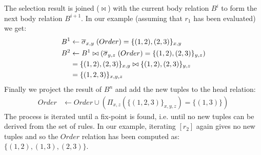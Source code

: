 The selection result is joined ($\bowtie$) with the current body relation $B^{i}$ to form the next body relation $B^{i + 1}$. In our example (assuming that $r_1$ has been evaluated) we get:
\begin{align*}
B^{1} &\leftarrow \overline{\sigma}_{x, y}\;(Order) = \{(1, 2), (2, 3)\}_{x, y}\\
B^{2} &\leftarrow B^{1} \bowtie (\overline{\sigma}_{y, z}\;(Order) = \{(1, 2), (2, 3)\}_{y, z})\\
      &= \{(1, 2), (2, 3)\}_{x, y} \bowtie \{(1, 2), (2, 3)\}_{y, z}\\
      &= \{(1,2,3)\}_{x,y,z}
\end{align*}
\noindent
Finally we project the result of $B^n$ and add the new tuples to the head relation:
\begin{align*}
Order & \leftarrow Order \cup (\Pi_{x,z}(\{(1,2,3)\}_{x,y,z}) = \{(1,3)\})
\end{align*}
\noindent
The process is iterated until a fix-point is found, i.e. until no new tuples can be derived from the set of rules. In our example, iterating $[r_2]$ again gives no new tuples and so the $Order$ relation has been computed as: $\{(1,2), (1,3), (2,3) \}$.